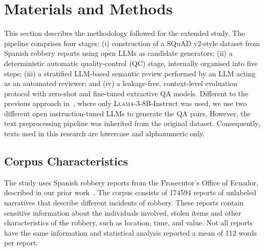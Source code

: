 \documentclass[graybox]{SNmult}
\begin{document}

\section{Materials and Methods}
\label{sec:methods}

This section describes the methodology followed for the extended
study. The pipeline comprises four stages: (i) construction of a SQuAD
v2-style dataset from Spanish robbery reports using open LLMs as
candidate generators; (ii) a deterministic automatic quality-control
(QC) stage, internally organised into five steps; (iii) a stratified LLM-based semantic review performed by an LLM
acting as an automated reviewer; and (iv) a leakage-free,
context-level evaluation protocol with zero-shot and fine-tuned
extractive QA models. Different to the previous approach
in~\cite{falconi2026robberyqa}, where only
\textsc{Llama}-3-8B-Instruct was used, we use two different open
instruction-tuned LLMs to generate the QA pairs. However, the text
preprocessing pipeline was inherited from the original
dataset. Consequently, texts used in this research are lowercase and
alphanumeric only. 

\subsection{Corpus Characteristics}

The study uses Spanish robbery reports from the Prosecutor's Office of
Ecuador, described in our prior work~\cite{falconi2026robberyqa}. The
corpus consists of 174594 reports of unlabeled narratives that
describe different incidents of robbery. These reports contain
sensitive information about the individuals involved, stolen items and
other characteristics of the robbery, such as location, time, and
value. Not all reports have the same information and statistical
analysis reported a mean of 112 words per report.
\end{document}
